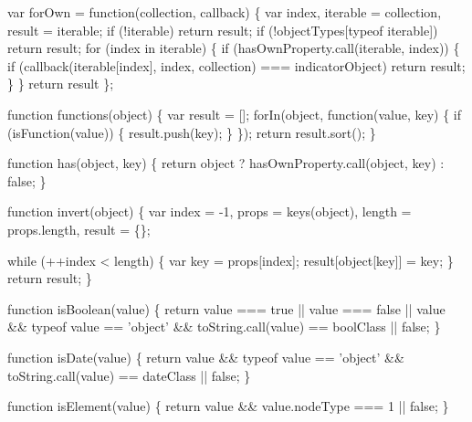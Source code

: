 \begin{DoxyCodeInclude}
{{  var forOwn = \textcolor{keyword}{function}(collection, callback) \{
    var index, iterable = collection, result = iterable;
    \textcolor{keywordflow}{if} (!iterable) \textcolor{keywordflow}{return} result;
    \textcolor{keywordflow}{if} (!objectTypes[typeof iterable]) \textcolor{keywordflow}{return} result;
      \textcolor{keywordflow}{for} (index in iterable) \{
        \textcolor{keywordflow}{if} (hasOwnProperty.call(iterable, index)) \{
          \textcolor{keywordflow}{if} (callback(iterable[index], index, collection) === indicatorObject) \textcolor{keywordflow}{return} result;
        \}
      \}
    \textcolor{keywordflow}{return} result
  \};

  \textcolor{keyword}{function} functions(\textcolor{keywordtype}{object}) \{
    var result = [];
    forIn(\textcolor{keywordtype}{object}, \textcolor{keyword}{function}(value, key) \{
      \textcolor{keywordflow}{if} (isFunction(value)) \{
        result.push(key);
      \}
    \});
    \textcolor{keywordflow}{return} result.sort();
  \}

  \textcolor{keyword}{function} has(\textcolor{keywordtype}{object}, key) \{
    \textcolor{keywordflow}{return} \textcolor{keywordtype}{object} ? hasOwnProperty.call(\textcolor{keywordtype}{object}, key) : \textcolor{keyword}{false};
  \}

  \textcolor{keyword}{function} invert(\textcolor{keywordtype}{object}) \{
    var index = -1,
        props = keys(\textcolor{keywordtype}{object}),
        length = props.length,
        result = \{\};

    \textcolor{keywordflow}{while} (++index < length) \{
      var key = props[index];
      result[\textcolor{keywordtype}{object}[key]] = key;
    \}
    \textcolor{keywordflow}{return} result;
  \}

  \textcolor{keyword}{function} isBoolean(value) \{
    \textcolor{keywordflow}{return} value === \textcolor{keyword}{true} || value === \textcolor{keyword}{false} ||
      value && typeof value == \textcolor{stringliteral}{'object'} && toString.call(value) == boolClass || \textcolor{keyword}{false};
  \}

  \textcolor{keyword}{function} isDate(value) \{
    \textcolor{keywordflow}{return} value && typeof value == \textcolor{stringliteral}{'object'} && toString.call(value) == dateClass || \textcolor{keyword}{false};
  \}

  \textcolor{keyword}{function} isElement(value) \{
    \textcolor{keywordflow}{return} value && value.nodeType === 1 || \textcolor{keyword}{false};
  \}

}}
\end{DoxyCodeInclude}
